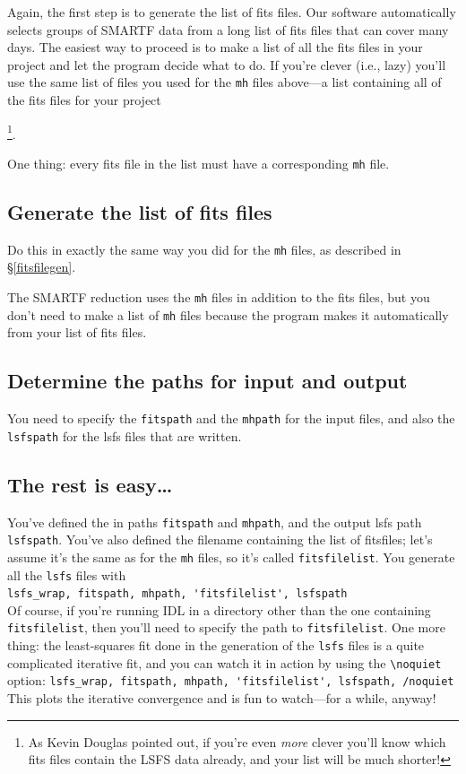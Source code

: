 \documentclass[psfig,preprint]{aastex}
\begin{document}
	Again, the first step is to generate the list of fits files. 
Our software automatically selects groups of SMARTF data from a long
list of fits files that can cover many days.  The easiest way to proceed
is to make a list of all the fits files in your project and let the
program decide what to do.  If you're clever (i.e., lazy) you'll use the
same list of files you used for the \verb$mh$ files above---a list
containing all of the fits files for your project{\footnote{As Kevin
Douglas pointed out, if you're even {\it more} clever you'll know which
fits files contain the LSFS data already, and your list will be much
shorter!}. 

	One thing: every fits file in the list must have a corresponding
\verb$mh$ file.

\subsection{Generate the list of fits files}
	Do this in exactly the same way you did for the \verb$mh$ files,
as described in \S \ref{fitsfilegen}.

	The SMARTF reduction uses the \verb$mh$ files in addition to the
fits files, but you don't need to make a list of \verb$mh$ files because
the program makes it automatically from your list of fits files. 

\subsection{Determine the paths for input and output}

	You need to specify the \verb$fitspath$ and the \verb$mhpath$
for the input files, and also the \verb$lsfspath$ for the lsfs files
that are written.

\subsection{The rest is easy\dots}

	You've defined the in paths \verb$fitspath$ and \verb$mhpath$,
and the output lsfs path \verb$lsfspath$.  You've also defined the
filename containing the list of fitsfiles; let's assume it's the same as
for the \verb$mh$ files, so it's called \verb$fitsfilelist$. 
You generate all the \verb$lsfs$ files with \\ 
\verb$lsfs_wrap, fitspath, mhpath, 'fitsfilelist', lsfspath$ \\
Of course, if you're running IDL in a directory other than the one containing
\verb$fitsfilelist$, then you'll need to specify the path to
\verb$fitsfilelist$. One more thing: the least-squares fit done in the
generation of the \verb$lsfs$ files is a quite complicated iterative
fit, and you can watch it in action by using the \verb$\noquiet$ option:
\verb$lsfs_wrap, fitspath, mhpath, 'fitsfilelist', lsfspath, /noquiet$ \\
This plots the iterative convergence and is fun to watch---for a while,
anyway! 

}
\end{document}
